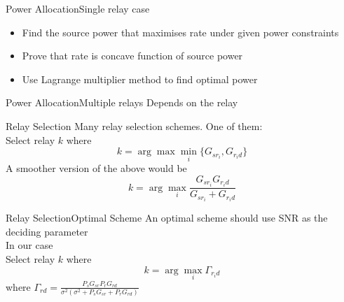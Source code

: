 \documentclass{beamer}
\begin{document}
\begin{frame}{Power Allocation}{Single relay case}
	\vspace{1cm}
	\begin{itemize}  
  \item
	  Find the source power that maximises rate under given power constraints
  \vspace{1cm}
  \pause
  \item Prove that rate is concave function of source power
  \pause
  \vspace{1cm}
  \item Use Lagrange multiplier method to find optimal power 	

	\end{itemize}
\end{frame}

\begin{frame}{Power Allocation}{Multiple relays}
	\vspace{-1cm}
	Depends on the relay
\end{frame}

\begin{frame}{Relay Selection}
	\vspace{-1cm}
Many relay selection schemes. One of them: \\ 
	\vspace{1cm}
	Select relay $k$
where 
	\begin{equation*}
		k = \arg \max\min\limits_{i} \{ G_{sr_i},G_{r_id} \} 
	\end{equation*}
	\pause
	A smoother version of the above would be
	\begin{equation*}
		k = \arg \max\limits_{i} \frac{ G_{sr_i}G_{r_id} }{ G_{sr_i}+G_{r_id} } 
	\end{equation*}
	
\end{frame}

\begin{frame}{Relay Selection}{Optimal Scheme}
	\vspace{-1cm}
	An optimal scheme should use SNR as the deciding parameter \\
	In our case \\
Select relay $k$
where 
	\begin{equation*}
		k = \arg \max\limits_{i} \Gamma_{r_id}
	\end{equation*}
	where $\Gamma_{rd} = \frac {P_s G_{sr} P_r G_{rd}}{\sigma^2(\sigma^2 + P_sG_{sr} + P_rG_{rd})}$	
\end{frame}
\end{document}
